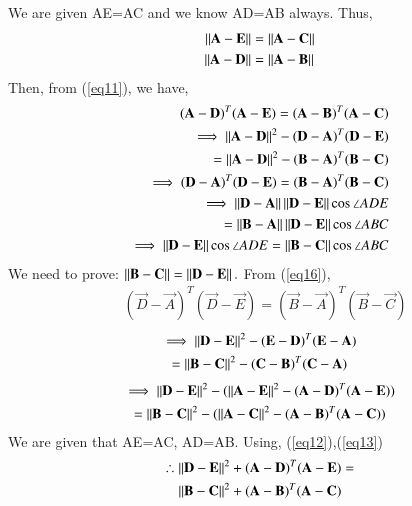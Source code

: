 \documentclass[journal,12pt,twocolumn]{IEEEtran}
\begin{document}
We are given AE=AC and we know AD=AB always. Thus, 
\begin{align}
    \left\lVert\mathbf{A}-\mathbf{E}\right\rVert  &=  \left\lVert\mathbf{A}-\mathbf{C}\right\rVert\label{eq12}\\
    \left\lVert\mathbf{A}-\mathbf{D}\right\rVert  &=  \left\lVert\mathbf{A}-\mathbf{B}\right\rVert\label{eq13}
\end{align}
Then, from (\ref{eq11}), we have,
\begin{align}
(\mathbf A -\mathbf D)^T(\mathbf{A}-\mathbf{E}) =  (\mathbf A -\mathbf B)^T(\mathbf{A}-\mathbf{C})\label{eq14}\\
\implies \left\lVert\mathbf{A}-\mathbf{D}\right\rVert^2 - (\mathbf D -\mathbf A)^T(\mathbf{D}-\mathbf{E})  \nonumber\\
\quad \quad =\left\lVert\mathbf{A}-\mathbf{D}\right\rVert^2 - (\mathbf B -\mathbf A)^T(\mathbf{B}-\mathbf{C}) \label{eq15}\\
 \implies (\mathbf D -\mathbf A)^T(\mathbf{D}-\mathbf{E}) = (\mathbf B -\mathbf A)^T(\mathbf{B}-\mathbf{C})\label{eq16}\\ 
 \implies \left\lVert\mathbf{D} - \mathbf{A}\right\rVert\left\lVert\mathbf{D} - \mathbf{E}\right\rVert\cos\angle ADE \nonumber\\
\quad \quad= \left\lVert\mathbf{B} - \mathbf{A}\right\rVert\left\lVert\mathbf{D} - \mathbf{E}\right\rVert\cos\angle ABC \label{eq17}\\
\implies \left\lVert\mathbf{D} - \mathbf{E}\right\rVert\cos\angle ADE  = \left\lVert\mathbf{B} - \mathbf{C}\right\rVert\cos\angle ABC \label{eq18}
\end{align}
We need to prove: $\left\lVert\mathbf{B} - \mathbf{C}\right\rVert = \left\lVert\mathbf{D} - \mathbf{E}\right\rVert.\\$ 
From (\ref{eq16}),
\begin{align}
& (\vec{D} -\vec{A})^T(\vec{D}-\vec{E}) = (\vec B -\vec A)^T(\vec{B}-\vec{C})\label{eq19}
\end{align}
\begin{multline}
\implies \left\lVert\mathbf{D}-\mathbf{E}\right\rVert^2 - (\mathbf E -\mathbf D)^T(\mathbf{E}-\mathbf{A}) \\
= \left\lVert\mathbf{B}-\mathbf{C}\right\rVert^2 - (\mathbf C -\mathbf B)^T(\mathbf{C}-\mathbf{A})\label{eq20}	
\end{multline}
\begin{multline}
\implies \left\lVert\mathbf{D}-\mathbf{E}\right\rVert^2 - (\left\lVert\mathbf{A}-\mathbf{E}\right\rVert^2 - (\mathbf A -\mathbf D)^T(\mathbf A -\mathbf E)) \\
 =\left\lVert\mathbf{B}-\mathbf{C}\right\rVert^2 - (\left\lVert\mathbf{A}-\mathbf{C}\right\rVert^2 - (\mathbf A -\mathbf B)^T(\mathbf A -\mathbf C))	\label{eq21}
\end{multline}
We are given that AE=AC, AD=AB. Using, (\ref{eq12}),(\ref{eq13})
\begin{multline}
\therefore \left\lVert\mathbf{D}-\mathbf{E}\right\rVert^2 + (\mathbf A -\mathbf D)^T(\mathbf{A}-\mathbf{E}) = \\ \left\lVert\mathbf{B}-\mathbf{C}\right\rVert^2 + (\mathbf A -\mathbf B)^T(\mathbf{A}-\mathbf{C}) \label{eq22}	
\end{multline}
\end{document}
